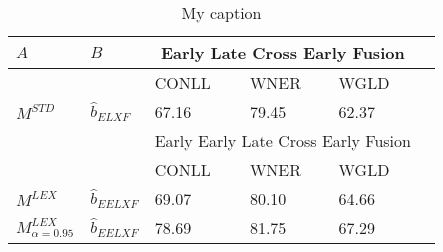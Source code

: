\begin{table}[]
\centering
\label{my-label}
\begin{tabular}{@{}llllll@{}}
\toprule
    $A$      &    $B$      & \multicolumn{3}{c}{Early Late Cross Early Fusion}                                            \\ \midrule
          &      &      CONLL                     & WNER                      & WGLD                      \\ \cmidrule{3-5}
$M^{STD}$ & $ \hat{b}_{\scriptscriptstyle ELXF}$ & 67.16                      & 79.45                     & 62.37                     \\
\midrule
          &        &   \multicolumn{3}{c}{Early Early Late Cross Early Fusion}                                             \\
\midrule     
          &          & CONLL                      & WNER                      & WGLD                      \\ \cmidrule{3-5}
$M^{LEX}$ & $ \hat{b}_{\scriptscriptstyle EELXF}$ & 69.07                      & 80.10                     & 64.66                     \\
$M^{LEX}_{\alpha=0.95}$ & $ \hat{b}_{\scriptscriptstyle EELXF}$  & 78.69                      & 81.75                     & 67.29                     \\		
\bottomrule
\end{tabular}
\caption{My caption}
\end{table}

